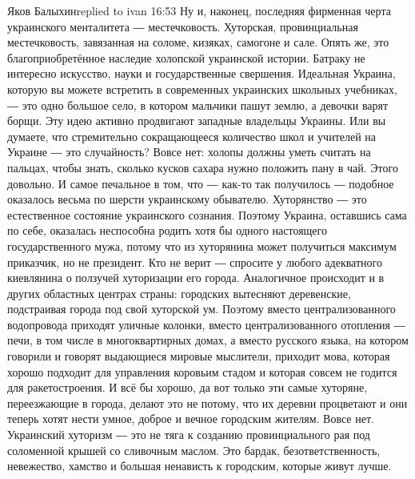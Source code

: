 Яков Балыхинreplied to ivan
16:53
Ну и, наконец, последняя фирменная черта украинского менталитета ― местечковость. Хуторская, провинциальная местечковость, завязанная на соломе, кизяках, самогоне и сале. Опять же, это благоприобретённое наследие холопской украинской истории. Батраку не интересно искусство, науки и государственные свершения. Идеальная Украина, которую вы можете встретить в современных украинских школьных учебниках, ― это одно большое село, в котором мальчики пашут землю, а девочки варят борщи. Эту идею активно продвигают западные владельцы Украины. Или вы думаете, что стремительно сокращающееся количество школ и учителей на Украине ― это случайность? Вовсе нет: холопы должны уметь считать на пальцах, чтобы знать, сколько кусков сахара нужно положить пану в чай. Этого довольно. И самое печальное в том, что ― как-то так получилось ― подобное оказалось весьма по шерсти украинскому обывателю. Хуторянство ― это естественное состояние украинского сознания. Поэтому Украина, оставшись сама по себе, оказалась неспособна родить хотя бы одного настоящего государственного мужа, потому что из хуторянина может получиться максимум приказчик, но не президент. Кто не верит ― спросите у любого адекватного киевлянина о ползучей хуторизации его города. Аналогичное происходит и в других областных центрах страны: городских вытесняют деревенские, подстраивая города под свой хуторской ум. Поэтому вместо централизованного водопровода приходят уличные колонки, вместо централизованного отопления ― печи, в том числе в многоквартирных домах, а вместо русского языка, на котором говорили и говорят выдающиеся мировые мыслители, приходит мова, которая хорошо подходит для управления коровьим стадом и которая совсем не годится для ракетостроения. И всё бы хорошо, да вот только эти самые хуторяне, переезжающие в города, делают это не потому, что их деревни процветают и они теперь хотят нести умное, доброе и вечное городским жителям. Вовсе нет. Украинский хуторизм ― это не тяга к созданию провинциального рая под соломенной крышей со сливочным маслом. Это бардак, безответственность, невежество, хамство и большая ненависть к городским, которые живут лучше.
